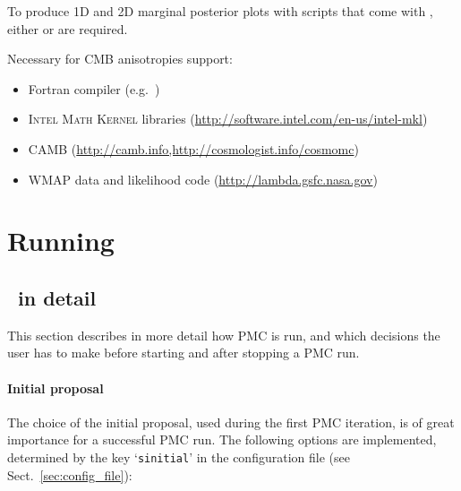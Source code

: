 \documentclass[11pt, chapterprefix, headsepline]{scrartcl}
\begin{document}
    To produce 1D and 2D marginal posterior plots with scripts that
    come with \CosmoPMC, either  or  are required.

\bigskip

Necessary for CMB anisotropies support:

\begin{itemize}

  \item Fortran compiler (e.g.~)

  \item \textsc{Intel Math Kernel}
    libraries ({\url{http://software.intel.com/en-us/intel-mkl}})

  \item CAMB ({\url{http://camb.info,http://cosmologist.info/cosmomc}})

  \item WMAP data and likelihood code ({\url{http://lambda.gsfc.nasa.gov}})

\end{itemize}





\section{Running \CosmoPMC}





\subsection{\CosmoPMC\ in detail}

This section describes in more detail how PMC is run, and which
decisions the user has to make before starting and after stopping a
PMC run.


\paragraph{Initial proposal}
\label{sec:ini_prop}

The choice of the initial proposal, used during the first PMC
iteration, is of great importance for a successful PMC run. The
following options are implemented, determined by the key
`\texttt{sinitial}' in the configuration file (see Sect.~\ref{sec:config_file}):
\end{document}
